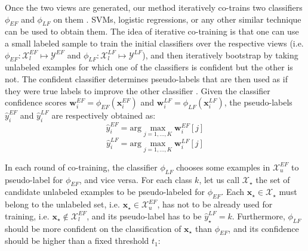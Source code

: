 \documentclass[journal,11pt]{IEEEtran}
\begin{document}
Once the two views are generated, our method iteratively co-trains two classifiers $\phi_{\scriptscriptstyle EF}$ and $\phi_{\scriptscriptstyle LF}$ on them \cite{blum1998combining}. SVMs, logistic regressions, or any other similar technique can be used to obtain them. 
The idea of iterative co-training is that one can use a small labeled sample to train the initial classifiers over the respective views (i.e. $\phi_{\scriptscriptstyle EF}: \mathcal{X}_l^{\scriptscriptstyle EF} \mapsto {\mathcal{Y}}^{\scriptscriptstyle EF}$ and $\phi_{\scriptscriptstyle LF}: \mathcal{X}_l^{\scriptscriptstyle LF} \mapsto {\mathcal{Y}}^{\scriptscriptstyle LF}$), and then iteratively bootstrap by taking unlabeled examples for which one of the classifiers is confident but the
other is not. The confident classifier determines pseudo-labels \cite{lee2013pseudo} that are then used as if they were true labels to improve the other classifier \cite{balcan2004co}. 
Given the classifier confidence scores $\mathbf{w}_i^{\scriptscriptstyle EF}=\phi_{\scriptscriptstyle EF}(\mathbf{x}_i^{\scriptscriptstyle EF})$ and $\mathbf{w}_i^{\scriptscriptstyle LF}=\phi_{\scriptscriptstyle LF}(\mathbf{x}_i^{\scriptscriptstyle LF})$, the pseudo-labels $\hat{y}_i^{\scriptscriptstyle EF}$ and $\hat{y}_i^{\scriptscriptstyle LF}$ are respectively obtained as:
\begin{equation}
\hat{y}_i^{\scriptscriptstyle EF}={\text{arg}} \!\!\! \max_{j=1,\ldots,K} \mathbf{w}_i^{\scriptscriptstyle EF}[j]
\label{eq:pseudo1}
\end{equation}
\begin{equation}
\hat{y}_i^{\scriptscriptstyle LF}={\text{arg}} \!\!\! \max_{j=1,\ldots,K} \mathbf{w}_i^{\scriptscriptstyle LF}[j]
\label{eq:pseudo2}
\end{equation}

In each round of co-training, the classifier $\phi_{\scriptscriptstyle LF}$ chooses some examples in $\mathcal{X}_u^{\scriptscriptstyle EF}$ to pseudo-label for $\phi_{\scriptscriptstyle EF}$, and vice versa. 
For each class $k$, let us call $\mathcal{X}_\star$ the set of candidate unlabeled examples to be pseudo-labeled for $\phi_{\scriptscriptstyle EF}$. Each $\mathbf{x}_\star \in \mathcal{X}_\star$ must belong to the unlabeled set, i.e. $\mathbf{x}_\star \in \mathcal{X}_u^{\scriptscriptstyle EF}$, has not to be already used for training, i.e. $\mathbf{x}_\star \notin \mathcal{X}_l^{\scriptscriptstyle EF}$, and its pseudo-label has to be $\hat{y}_\star^{\scriptscriptstyle LF}=k$. Furthermore, $\phi_{\scriptscriptstyle LF}$ should be more confident on the classification of $\mathbf{x}_\star$ than $\phi_{\scriptscriptstyle EF}$, and its confidence should be higher than a fixed threshold $t_1$:
\end{document}

